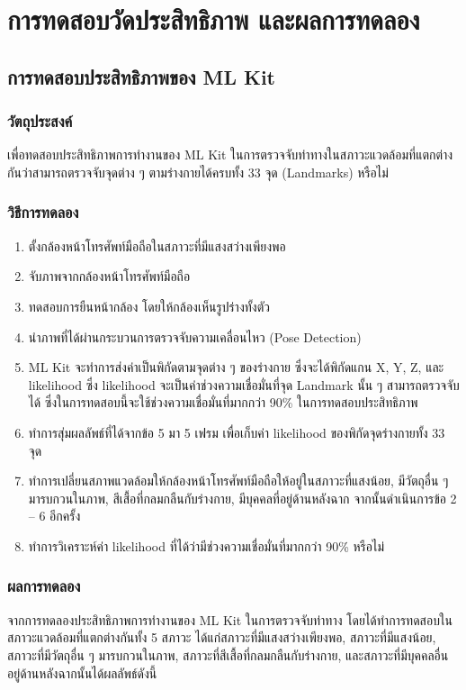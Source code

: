 \chapter{การทดสอบวัดประสิทธิภาพ และผลการทดลอง}

\section{การทดสอบประสิทธิภาพของ ML Kit}

\tocless\subsection{วัตถุประสงค์}
เพื่อทดสอบประสิทธิภาพการทำงานของ ML Kit ในการตรวจจับท่าทางในสภาวะแวดล้อมที่แตกต่างกันว่าสามารถตรวจจับจุดต่าง ๆ ตามร่างกายได้ครบทั้ง 33 จุด (Landmarks) หรือไม่

\tocless\subsection{วิธีการทดลอง}
\begin{enumerate}
	\item ตั้งกล้องหน้าโทรศัพท์มือถือในสภาวะที่มีแสงสว่างเพียงพอ
	\item จับภาพจากกล้องหน้าโทรศัพท์มือถือ
	\item ทดสอบการยืนหน้ากล้อง โดยให้กล้องเห็นรูปร่างทั้งตัว
	\item นำภาพที่ได้ผ่านกระบวนการตรวจจับความเคลื่อนไหว (Pose Detection)
	\item ML Kit จะทำการส่งค่าเป็นพิกัดตามจุดต่าง ๆ ของร่างกาย ซึ่งจะได้พิกัดแกน X, Y, Z, และ likelihood ซึ่ง likelihood จะเป็นค่าช่วงความเชื่อมั่นที่จุด Landmark นั้น ๆ สามารถตรวจจับได้ ซึ่งในการทดสอบนี้จะใช้ช่วงความเชื่อมั่นที่มากกว่า 90\% ในการทดสอบประสิทธิภาพ
	\item ทำการสุ่มผลลัพธ์ที่ได้จากข้อ 5 มา 5 เฟรม เพื่อเก็บค่า likelihood ของพิกัดจุดร่างกายทั้ง 33 จุด
	\item ทำการเปลี่ยนสภาพแวดล้อมให้กล้องหน้าโทรศัพท์มือถือให้อยู่ในสภาวะที่แสงน้อย, มีวัตถุอื่น ๆ มารบกวนในภาพ, สีเสื้อที่กลมกลืนกับร่างกาย, มีบุคคลที่อยู่ด้านหลังฉาก จากนั้นดำเนินการข้อ 2 – 6 อีกครั้ง
	\item ทำการวิเคราะห์ค่า likelihood ที่ได้ว่ามีช่วงความเชื่อมั่นที่มากกว่า 90\% หรือไม่
\end{enumerate}

\tocless\subsection{ผลการทดลอง}
จากการทดลองประสิทธิภาพการทำงานของ ML Kit ในการตรวจจับท่าทาง โดยได้ทำการทดสอบในสภาวะแวดล้อมที่แตกต่างกันทั้ง 5 สภาวะ ได้แก่สภาวะที่มีแสงสว่างเพียงพอ, สภาวะที่มีแสงน้อย, สภาวะที่มีวัตถุอื่น ๆ มารบกวนในภาพ, สภาวะที่สีเสื้อที่กลมกลืนกับร่างกาย, และสภาวะที่มีบุคคลอื่นอยู่ด้านหลังฉากนั้นได้ผลลัพธ์ดังนี้
